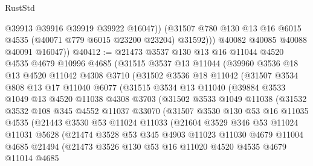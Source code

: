 \begin{lexlean}{RustStd}
\begin{coremodule}
                @39913
                @39916
                @39919
                @39922
                @16047))
            (@31507 @780 @130 @13 @16 @6015 @4535 (@40071 @779 @6015 @23200 @23204) @31592)))
        @40082
        @40085
        @40088
        @40091
        @16047))
@40412 := @21473
    @3537
    @130
    @13
    @16
    @11044
    @4520
    @4535
    @4679
    @10996
    @4685
    (@31515
      @3537
      @13
      @11044
      (@39960
        @3536
        @18
        @13
        @4520
        @11042
        @4308
        @3710
        (@31502
          @3536
          @18
          @11042
          (@31507
            @3534
            @808
            @13
            @17
            @11040
            @6077
            (@31515
              @3534
              @13
              @11040
              (@39884
                @3533
                @1049
                @13
                @4520
                @11038
                @4308
                @3703
                (@31502
                  @3533
                  @1049
                  @11038
                  (@31532
                    @3532
                    @108
                    @345
                    @4552
                    @11037
                    @33070
                    (@31507
                      @3530
                      @130
                      @53
                      @16
                      @11035
                      @4535
                      (@21443
                        @3530
                        @53
                        @11024
                        @11033
                        (@21604
                          @3529
                          @346
                          @53
                          @11024
                          @11031
                          @5628
                          (@21474
                            @3528
                            @53
                            @345
                            @4903
                            @11023
                            @11030
                            @4679
                            @11004
                            @4685
                            @21494
                            (@21473
                              @3526
                              @130
                              @53
                              @16
                              @11020
                              @4520
                              @4535
                              @4679
                              @11014
                              @4685

\end{coremodule}
\end{lexlean}
